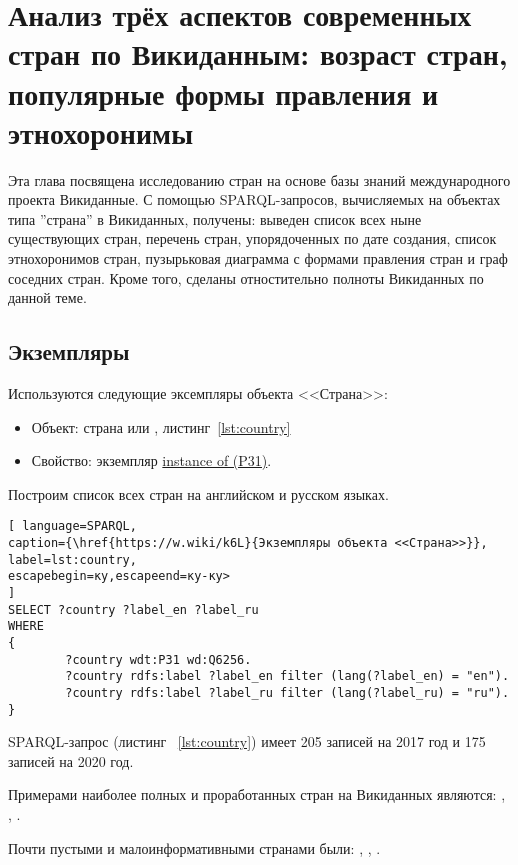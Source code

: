 \chapter{Анализ трёх аспектов современных стран по Викиданным: возраст стран, популярные формы правления и этнохоронимы}
\label{ch:country}

Эта глава посвящена исследованию стран на основе базы знаний международного проекта Викиданные. С помощью SPARQL-запросов, вычисляемых на объектах типа ”страна” в Викиданных, получены: выведен список всех ныне существующих стран, перечень стран, упорядоченных по дате создания, список этнохоронимов стран, пузырьковая диаграмма с формами правления стран и граф соседних стран. Кроме того, сделаны отностительно полноты Викиданных по данной теме.
\section{Экземпляры}

Используются следующие эксемпляры объекта <<Страна>>:
\begin{itemize}
	\item Объект: страна или , листинг~\ref{lst:country}
	\item Свойство: экземпляр \href{https://www.wikidata.org/wiki/Property:P31}{instance of (P31)}.
\end{itemize}

Построим список всех стран на английском и русском языках.

\begin{lstlisting}[ language=SPARQL, 
caption={\href{https://w.wiki/k6L}{Экземпляры объекта <<Страна>>}},
label=lst:country, 
escapebegin=ку,escapeend=ку-ку>
]
SELECT ?country ?label_en ?label_ru
WHERE
{
		?country wdt:P31 wd:Q6256.
		?country rdfs:label ?label_en filter (lang(?label_en) = "en").
		?country rdfs:label ?label_ru filter (lang(?label_ru) = "ru").
}
\end{lstlisting}

SPARQL-запрос (листинг ~\ref{lst:country}) имеет 205 записей на 2017 год и 175 записей на 2020 год.

Примерами наиболее полных и проработанных стран на Викиданных являются:  , , .

Почти пустыми и малоинформативными странами были: , , .

